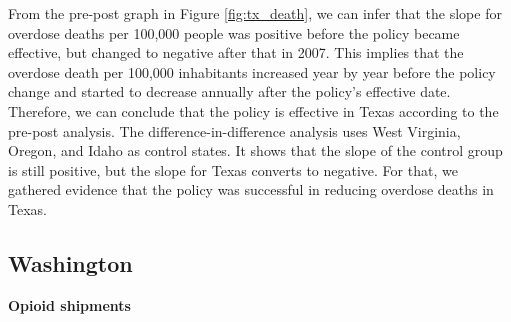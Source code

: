 \documentclass[12pt,letterpaper]{article}
\begin{document}
From the pre-post graph in Figure \ref{fig:tx_death}, we can infer that the slope for overdose deaths per 100,000 people was positive before the policy became effective, but changed to negative after that in 2007. This implies that the overdose death per 100,000 inhabitants increased year by year before the policy change and started to decrease annually after the policy's effective date. Therefore, we can conclude that the policy is effective in Texas according to the pre-post analysis. The difference-in-difference analysis uses West Virginia, Oregon, and Idaho as control states. It shows that the slope of  the control group is still positive, but the slope for Texas converts to negative. For that, we gathered evidence that the policy was successful in reducing overdose deaths in Texas.

\subsection{Washington}
\textbf{Opioid shipments}
\end{document}
